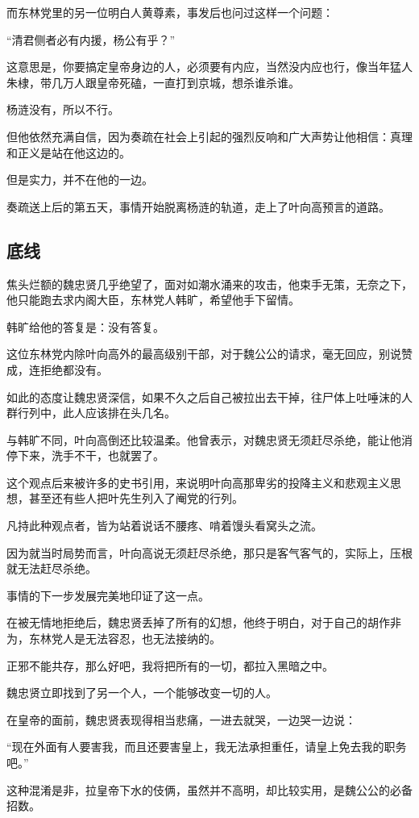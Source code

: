 \begin{multicols}{\theparacolNo}
而东林党里的另一位明白人黄尊素，事发后也问过这样一个问题：

“清君侧者必有内援，杨公有乎？”

这意思是，你要搞定皇帝身边的人，必须要有内应，当然没内应也行，像当年猛人朱棣，带几万人跟皇帝死磕，一直打到京城，想杀谁杀谁。

杨涟没有，所以不行。

但他依然充满自信，因为奏疏在社会上引起的强烈反响和广大声势让他相信：真理和正义是站在他这边的。

但是实力，并不在他的一边。

奏疏送上后的第五天，事情开始脱离杨涟的轨道，走上了叶向高预言的道路。

\subsection{底线}
焦头烂额的魏忠贤几乎绝望了，面对如潮水涌来的攻击，他束手无策，无奈之下，他只能跑去求内阁大臣，东林党人韩旷，希望他手下留情。

韩旷给他的答复是：没有答复。

这位东林党内除叶向高外的最高级别干部，对于魏公公的请求，毫无回应，别说赞成，连拒绝都没有。

如此的态度让魏忠贤深信，如果不久之后自己被拉出去干掉，往尸体上吐唾沫的人群行列中，此人应该排在头几名。

与韩旷不同，叶向高倒还比较温柔。他曾表示，对魏忠贤无须赶尽杀绝，能让他消停下来，洗手不干，也就罢了。

这个观点后来被许多的史书引用，来说明叶向高那卑劣的投降主义和悲观主义思想，甚至还有些人把叶先生列入了阉党的行列。

凡持此种观点者，皆为站着说话不腰疼、啃着馒头看窝头之流。

因为就当时局势而言，叶向高说无须赶尽杀绝，那只是客气客气的，实际上，压根就无法赶尽杀绝。

事情的下一步发展完美地印证了这一点。

在被无情地拒绝后，魏忠贤丢掉了所有的幻想，他终于明白，对于自己的胡作非为，东林党人是无法容忍，也无法接纳的。

正邪不能共存，那么好吧，我将把所有的一切，都拉入黑暗之中。

魏忠贤立即找到了另一个人，一个能够改变一切的人。

在皇帝的面前，魏忠贤表现得相当悲痛，一进去就哭，一边哭一边说：

“现在外面有人要害我，而且还要害皇上，我无法承担重任，请皇上免去我的职务吧。”

这种混淆是非，拉皇帝下水的伎俩，虽然并不高明，却比较实用，是魏公公的必备招数。


\end{multicols}
